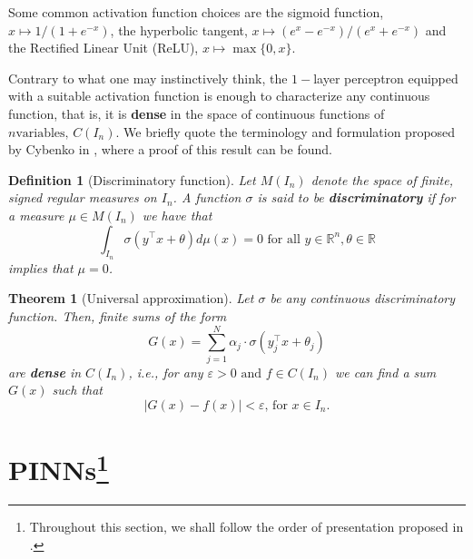 \documentclass[12pt]{report} %
\newtheorem{definition}{Definition}
\newtheorem{theorem}{Theorem}
\newcommand{\tmstrong}[1]{\textbf{#1}}
\begin{document}
Some common activation function choices are the sigmoid function, $x \mapsto 1/(1 + e^{- x})$, the hyperbolic tangent, $x \mapsto (e^x - e^{- x})/(e^x + e^{- x})$ and the Rectified Linear Unit (ReLU), $x \mapsto \max \{ 0, x \}$. 

Contrary to what one may instinctively think, the $1 -$layer perceptron equipped with a suitable activation function is
enough to characterize any continuous function, that is, it is
{\tmstrong{dense}} in the space of continuous functions of $n \text{
variables, } C (I_n)$. We briefly quote the terminology and formulation
proposed by Cybenko in \cite{cybenko1989approximation}, where a proof of this result can be found.

\begin{definition}[Discriminatory function]
  Let $M (I_n)$ denote the space of finite, signed regular measures on $I_n$.
  A function $\sigma$ is said to be {\tmstrong{discriminatory}} if for a
  measure $\mu \in M (I_n)$ we have that
  \[ \int_{I_n} \sigma (y^{\top} x + \theta) d \mu (x) = 0 \text{ for all } y
     \in \mathbb{R}^n, \theta \in \mathbb{R} \]
  implies that $\mu = 0$.
\end{definition}

\begin{theorem}[Universal approximation]
  Let $\sigma$ be any continuous discriminatory function. Then, finite sums of
  the form
  \[ G (x) = \sum_{j = 1}^N \alpha_j \cdot \sigma (y_j^{\top} x + \theta_j) \]
  are \textbf{dense} in $C (I_n)$, i.e., for any $\varepsilon > 0 \text{ and } f \in C
  (I_n)$ we can find a sum $G (x)$ such that
  \[ | G (x) - f (x) | < \varepsilon \text{, for } x \in I_n . \]
\end{theorem}



\section[PINNs]{PINNs\footnote{Throughout this section, we shall follow the order of presentation proposed in \cite{cuomo2022scientific}.}}
\end{document}
